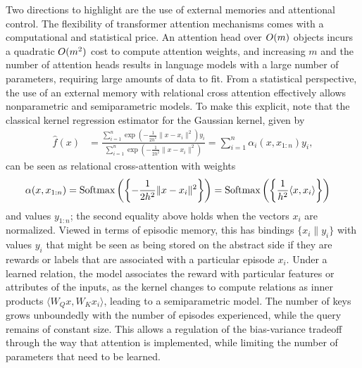 Two directions to highlight are the use of external memories and attentional control. The flexibility of transformer attention mechanisms comes with a computational and statistical price. An attention head over 
$O(m)$ objects incurs a quadratic $O(m^2)$ cost to compute attention weights, and increasing $m$ and the number of attention heads results in language models with a large number of parameters, requiring large amounts of data to fit.
From a statistical perspective, the use of an external memory with relational cross attention effectively allows nonparametric and semiparametric models. To make this explicit, note that the classical kernel regression estimator for the Gaussian kernel,
given by
\begin{align*}
  \hat f(x) &= \frac{\sum_{i=1}^n \exp\left(-\frac{1}{2h^2} \|x-x_i\|^2\right) y_i}{\sum_{i=1}^n \exp\left(-\frac{1}{2h^2} \|x-x_i\|^2\right)} 
  = \sum_{i=1}^n \alpha_i(x, x_{1:n}) y_i,
\end{align*}
can be seen as relational cross-attention with weights
\begin{align*}
    \alpha(x, x_{1:n}) &= \text{Softmax}\left(\left\{-\frac{1}{2h^2}\|x-x_i\|^2\right\}\right) 
    = \text{Softmax}\left(\left\{\frac{1}{h^2}\langle x, x_i\rangle\right\}\right)
\end{align*}
and values $y_{1:n}$; the second equality above holds when the vectors $x_i$ are normalized.
Viewed in terms of episodic memory, this has bindings $\{x_i\| y_i\}$ with values $y_i$ that 
might be seen as being stored on the abstract side if they are rewards or labels that are associated with 
a particular episode $x_i$. Under a learned relation, the model associates the reward with particular features or attributes of the inputs, as the kernel changes to compute relations as inner products $\langle W_Q x, W_K x_i \rangle$, leading to a semiparametric model. The number of keys grows unboundedly with the number of episodes experienced, while the query remains of constant size. This allows a regulation of the bias-variance tradeoff through the way that attention is implemented, while limiting the number of parameters that need to be learned.

